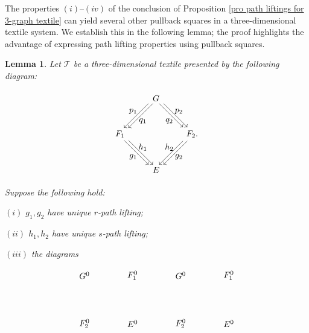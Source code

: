 \documentclass[a4paper,reqno,12pt]{amsart}
\newtheorem{lem}[thm]{Lemma}
\theoremstyle{definition}
\theoremstyle{remark}
\begin{document}
The properties $(i)$--$(iv)$ of the conclusion of Proposition \ref{pro path liftings for 3-graph textile} can yield several other pullback squares in a three-dimensional textile system. We establish this in the following lemma; the proof highlights the advantage of expressing path lifting properties using pullback squares.
\begin{lem}\label{lem other pullbacks}
Let $\mathcal{T}$ be a three-dimensional textile presented by the following diagram: 

\[
\begin{tikzpicture}[scale=1]
\node[inner sep=2.5pt, circle] (B) at (-1.5,0) {$F_1$};
\node[inner sep=2.5pt, circle] (C) at (1.5,0) {$F_2.$};	
\node[inner sep=2.5pt, circle] (D) at (0,-1.5) {$E$};
\node[inner sep=2.5pt, circle] (A) at (0,1.5) {$G$}; 

\draw[transform canvas={xshift=0.6ex}, ->] (A) -- (B);
\draw[transform canvas={xshift=-0.6ex}, ->] (A) -- (B);

\draw[transform canvas={xshift=0.6ex}, ->] (A) -- (C);
\draw[transform canvas={xshift=-0.6ex}, ->] (A) -- (C);

\draw[transform canvas={xshift=0.6ex}, ->] (C) -- (D);
\draw[transform canvas={xshift=-0.6ex}, ->] (C) -- (D);

\draw[transform canvas={xshift=0.6ex}, ->] (B) -- (D);
\draw[transform canvas={xshift=-0.6ex}, ->] (B) -- (D);

\node at (-0.55,0.55) {$q_1$};
\node at (-0.95,0.95) {$p_1$};

\node at (0.55,0.55) {$q_2$};
\node at (0.95,0.95) {$p_2$};

\node at (-0.55,-0.55) {$h_1$};
\node at (-0.95,-0.95) {$g_1$};

\node at (0.55,-0.55) {$h_2$};
\node at (0.95,-0.95) {$g_2$};
\end{tikzpicture}
\] Suppose the following hold: 

$(i)$ $g_1,g_2$ have unique $r$-path lifting;

$(ii)$ $h_1,h_2$ have unique $s$-path lifting;

$(iii)$ the diagrams 

\[
\begin{tikzpicture}[scale=1]
\node[] (A1) at (0,0) {$G^0$};
\node[] (A2) at (2,0) {$F_1^0$};
\node[] (A3) at (4,0) {$G^0$};
\node[] (A4) at (6,0) {$F_1^0$};

\node[] (B1) at (0,-2) {$F_2^0$};
\node[] (B2) at (2,-2) {$E^0$};
\node[] (B3) at (4,-2) {$F_2^0$};
\node[] (B4) at (6,-2) {$E^0$};



\end{tikzpicture}\]
\end{lem}
\end{document}
